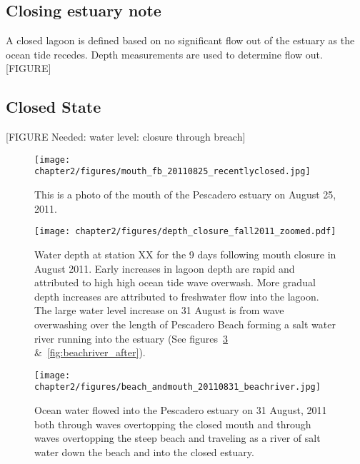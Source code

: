 \subsection{Closing estuary note} \label{closingest} A closed lagoon is
defined based on no significant flow out of the estuary as the ocean
tide recedes. Depth measurements are used to determine flow out.
[FIGURE]

\subsection{Closed State} \label{closed dynamics}


[FIGURE Needed: water level: closure through breach]

\begin{figure}
\texttt{[image: chapter2/figures/mouth\_fb\_20110825\_recentlyclosed.jpg]} \caption{This is a photo of the
mouth of the Pescadero estuary on August 25, 2011.}
\label{fig:mouth_fb_20110825} \end{figure}

\begin{figure}
\texttt{[image: chapter2/figures/depth\_closure\_fall2011\_zoomed.pdf]} \caption{Water depth at station XX for the 9 days following mouth closure in August 2011. Early increases in lagoon depth are rapid and attributed to high high ocean tide wave overwash. More gradual depth increases are attributed to freshwater flow into the lagoon. The large water level increase on 31 August is from wave overwashing over the length of Pescadero Beach forming a salt water river running into the estuary (See figures~\ref{fig:beachriver} \&~\ref{fig:beachriver_after}).}
\label{fig:depthclosuref11} \end{figure}


\begin{figure}
\texttt{[image: chapter2/figures/beach\_andmouth\_20110831\_beachriver.jpg]} \caption{Ocean water flowed into the Pescadero estuary on 31 August, 2011 both through waves overtopping the closed mouth and through waves overtopping the steep beach and traveling as a river of salt water down the beach and into the closed estuary.}
\label{fig:beachriver} \end{figure}

